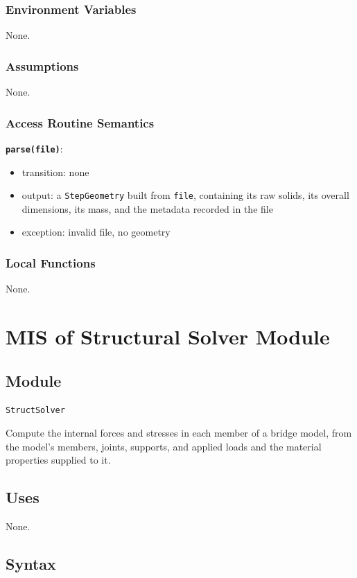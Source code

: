 \documentclass[12pt, titlepage]{article}
\begin{document}
\subsubsection{Environment Variables}
None.

\subsubsection{Assumptions}
None.

\subsubsection{Access Routine Semantics}

\textbf{\texttt{parse(file)}}:
\begin{itemize}
  \item transition: none
  \item output: a \texttt{StepGeometry} built from \texttt{file}, containing its raw solids, its overall dimensions, its mass, and the metadata recorded in the file
  \item exception: invalid file, no geometry
\end{itemize}

\subsubsection{Local Functions}
None.

\newpage

\section{MIS of Structural Solver Module} \label{mSolver}

\subsection{Module}
\texttt{StructSolver}

Compute the internal forces and stresses in each member of a bridge model, from the model's members, joints, supports, and applied loads and the material properties supplied to it.

\subsection{Uses}
None.

\subsection{Syntax}
\end{document}
